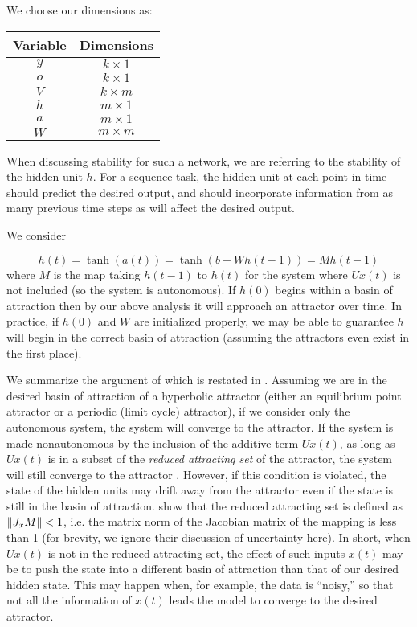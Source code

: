 We choose our dimensions as:

\begin{center}
\begin{tabular}{c c}
  Variable & Dimensions \\
  \hline
  $y$ & $k \times 1$ \\
  $o$ & $k \times 1$ \\
  $V$ & $k \times m$ \\
  $h$ & $m \times 1$ \\
  $a$ & $m \times 1$ \\
  $W$ & $m \times m$
\end{tabular}
\end{center}

When discussing stability for such a network, we are referring to the stability of the hidden unit $h$. For a sequence task, the hidden unit at each point in time should predict the desired output, and should incorporate information from as many previous time steps as will affect the desired output.

We consider

\begin{equation*}
h(t) = \tanh(a(t)) = \tanh(b + W h(t-1)) = M h(t-1)
\end{equation*}
%
where $M$ is the map taking $h(t - 1)$ to $h(t)$ for the system where $Ux(t)$ is not included (so the system is autonomous). If $h(0)$ begins within a basin of attraction then by our above analysis it will approach an attractor over time. In practice, if $h(0)$ and $W$ are initialized properly, we may be able to guarantee $h$ will begin in the correct basin of attraction (assuming the attractors even exist in the first place).

We summarize the argument of \citealt{DBLP:journals/tnn/BengioSF94} which is restated in \citealt{Hochreiter2001}. Assuming we are in the desired basin of attraction of a hyperbolic attractor (either an equilibrium point attractor or a periodic (limit cycle) attractor), if we consider only the autonomous system, the system will converge to the attractor. If the system is made nonautonomous by the inclusion of the additive term $Ux(t)$, as long as $Ux(t)$ is in a subset of the \emph{reduced attracting set} of the attractor, the system will still converge to the attractor \cite[p. 160]{DBLP:journals/tnn/BengioSF94}. However, if this condition is violated, the state of the hidden units may drift away from the attractor even if the state is still in the basin of attraction. \citeauthor*{DBLP:journals/tnn/BengioSF94} show that the reduced attracting set is defined as $\left\lVert J_x M \right\rVert < 1$, i.e. the matrix norm of the Jacobian matrix of the mapping is less than 1 (for brevity, we ignore their discussion of uncertainty here). In short, when $Ux(t)$ is not in the reduced attracting set, the effect of such inputs $x(t)$ may be to push the state into a different basin of attraction than that of our desired hidden state. This may happen when, for example, the data is ``noisy,'' so that not all the information of $x(t)$ leads the model to converge to the desired attractor.

